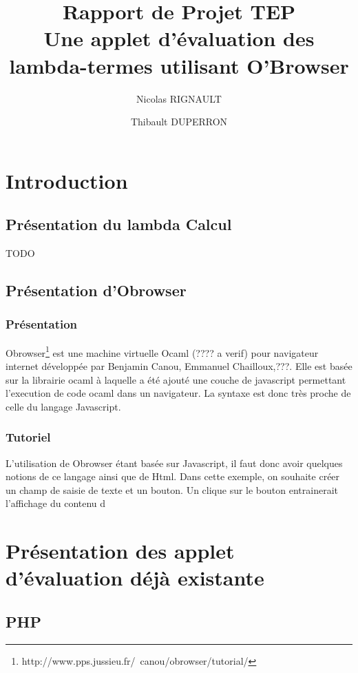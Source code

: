 \documentclass[a4paper,11pt,titlepage]{article}
\title{Rapport de Projet TEP\\Une applet d'évaluation des lambda-termes utilisant O'Browser}
\author{Nicolas RIGNAULT \and Thibault DUPERRON}
\begin{document}
\renewcommand{\bibname}{}
\renewcommand{\refname}{}
\maketitle
\tableofcontents

\newpage
\section{Introduction}


\subsection{Présentation du lambda Calcul}

TODO

\subsection{Présentation d'Obrowser}

\subsubsection{Présentation}
Obrowser\footnote{http://www.pps.jussieu.fr/~canou/obrowser/tutorial/} est une machine virtuelle Ocaml (???? a verif) pour navigateur internet développée par Benjamin Canou, Emmanuel Chailloux,???. Elle est basée sur la librairie ocaml à laquelle a été ajouté une couche de javascript permettant l'execution de code ocaml dans un navigateur. La syntaxe est donc très proche de celle du langage Javascript.

\subsubsection{Tutoriel}
L'utilisation de Obrowser étant basée sur Javascript, il faut donc avoir quelques notions de ce langage ainsi que de Html. Dans cette exemple, on souhaite créer un champ de saisie de texte et un bouton. Un clique sur le bouton entrainerait l'affichage du contenu d

\newpage

\section{Présentation des applet d'évaluation déjà existante}

\subsection{PHP}
\end{document}
